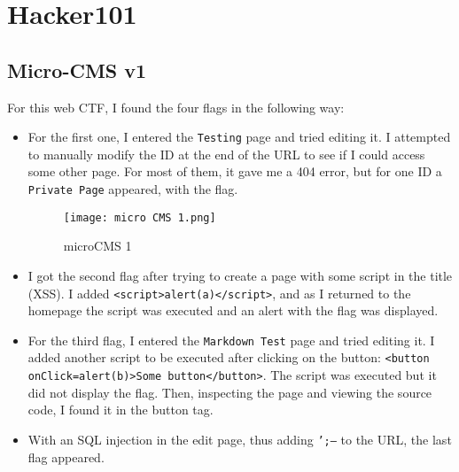 \documentclass{article}
\begin{document}
\section{Hacker101}
\subsection{Micro-CMS v1}
For this web CTF, I found the four flags in the following way:
\begin{itemize}
    \item {For the first one, I entered the \texttt{Testing} page and tried editing it.
    I attempted to manually modify the ID at the end of the URL to see if I could access some other page.
    For most of them, it gave me a 404 error, but for one ID a \texttt{Private Page} appeared, with the flag.
    \begin{figure}[H]
        \centering
        \texttt{[image: micro CMS 1.png]}
        \caption{microCMS 1}
        \label{fig:microCMS 1}
    \end{figure}
    }
    
    \item {I got the second flag after trying to create a page with some script in the title (XSS).
    I added \texttt{<script>alert(a)</script>}, and as I returned to the homepage the script was executed and an alert with the flag was displayed.}
    
    \item {For the third flag, I entered the \texttt{Markdown Test} page and tried editing it.
    I added another script to be executed after clicking on the button: \texttt{<button onClick=alert(b)>Some button</button>}.
    The script was executed but it did not display the flag. Then, inspecting the page and viewing the source code, I found it in the button tag.}
    
    \item {With an SQL injection in the edit page, thus adding \texttt{';--} to the URL, the last flag appeared.}
\end{itemize}
\end{document}
